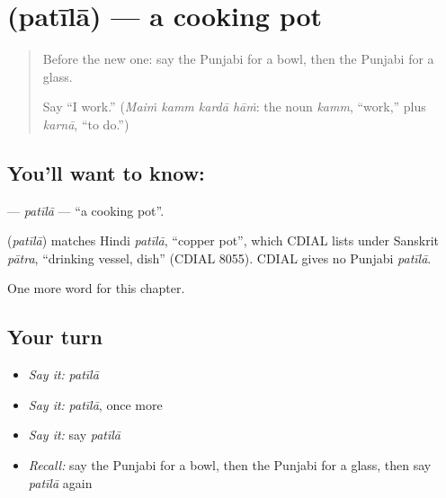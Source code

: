 \section[\texorpdfstring{\pa{ਪਤੀਲਾ} (patīlā)}{ਪਤੀਲਾ (patīlā)}]{ (patīlā) — a cooking pot}

\label{lesson:PA-C113-patila}



\begin{quote}
Before the new one: say the Punjabi for a bowl, then the Punjabi for a glass.

Say \textquotedblleft{}I work.\textquotedblright{} (\emph{Maiṁ kamm kardā hāṁ}: the noun \emph{kamm}, \textquotedblleft{}work,\textquotedblright{} plus \emph{karnā}, \textquotedblleft{}to do.\textquotedblright{})
\end{quote}

\subsection*{You'll want to know: }
\textbf{} — \emph{patīlā} — \textquotedblleft{}a cooking pot\textquotedblright{}.

\begin{cousinweb}
\textbf{} (\emph{patīlā}) matches Hindi \emph{patīlā}, \textquotedblleft{}copper pot\textquotedblright{}, which CDIAL lists under Sanskrit \emph{pātra}, \textquotedblleft{}drinking vessel, dish\textquotedblright{} (CDIAL 8055). CDIAL gives no Punjabi \emph{patīlā}.
\end{cousinweb}

\begin{grammarlens}[title={What you've built}]
One more word for this chapter.
\end{grammarlens}

\subsection*{Your turn}
\begin{itemize}
\raggedright
  \item \emph{Say it:} \emph{patīlā}
  \item \emph{Say it:} \emph{patīlā}, once more
  \item \emph{Say it:} say \emph{patīlā}
  \item \emph{Recall:} say the Punjabi for a bowl, then the Punjabi for a glass, then say \emph{patīlā} again
\end{itemize}


